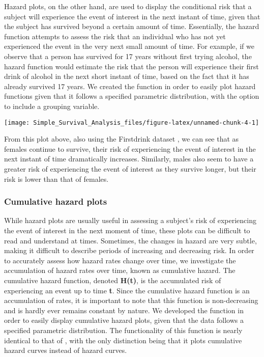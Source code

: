 Hazard plots, on the other hand, are used to display the conditional
risk that a subject will experience the event of interest in the next
instant of time, given that the subject has survived beyond a certain
amount of time. Essentially, the hazard function attempts to assess the
risk that an individual who has not yet experienced the event in the
very next small amount of time. For example, if we observe that a person
has survived for 17 years without first trying alcohol, the hazard
function would estimate the risk that the person will experience their
first drink of alcohol in the next short instant of time, based on the
fact that it has already survived 17 years. We created the
 function in order to easily plot hazard functions given
that it follows a specified parametric distribution, with the option to
include a grouping variable.

\begin{Schunk}

\texttt{[image: Simple\_Survival\_Analysis\_files/figure-latex/unnamed-chunk-4-1]} \end{Schunk}

From this plot above, also using the Firstdrink dataset , we can see
that as females continue to survive, their risk of experiencing the
event of interest in the next instant of time dramatically increases.
Similarly, males also seem to have a greater risk of experiencing the
event of interest as they survive longer, but their risk is lower than
that of females.

\hypertarget{cumulative-hazard-plots}{%
\subsubsection{Cumulative hazard plots}\label{cumulative-hazard-plots}}

While hazard plots are usually useful in assessing a subject's risk of
experiencing the event of interest in the next moment of time, these
plots can be difficult to read and understand at times. Sometimes, the
changes in hazard are very subtle, making it difficult to describe
periods of increasing and decreasing risk. In order to accurately assess
how hazard rates change over time, we investigate the accumulation of
hazard rates over time, known as cumulative hazard. The cumulative
hazard function, denoted \textbf{H(t)}, is the accumulated risk of
experiencing an event up to time \textbf{t}. Since the cumulative hazard
function is an accumulation of rates, it is important to note that this
function is non-decreasing and is hardly ever remains constant by
nature. We developed the function  in order to easily
display cumulative hazard plots, given that the data follows a specified
parametric distribution. The functionality of this function is nearly
identical to that of , with the only distinction being
that it plots cumulative hazard curves instead of hazard curves.

